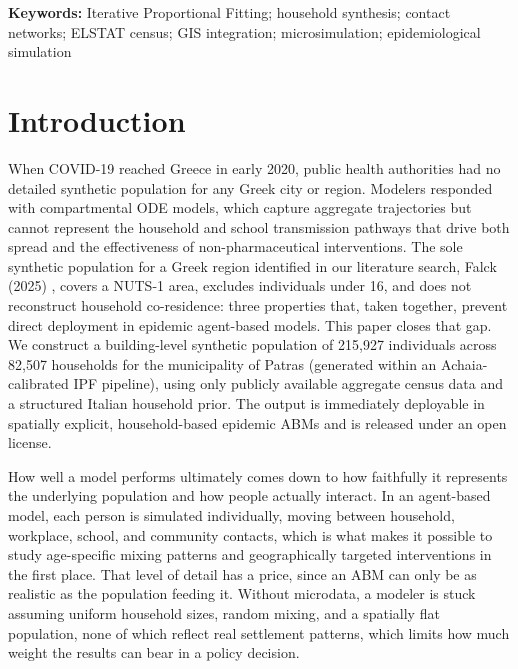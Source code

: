 \documentclass{article}
\begin{document}
\textbf{Keywords:} Iterative Proportional Fitting; household synthesis; contact networks; ELSTAT census; GIS integration; microsimulation; epidemiological simulation

\section{Introduction}\label{introduction}

When COVID-19 reached Greece in early 2020, public health authorities had no detailed synthetic population for any Greek city or region. Modelers responded with compartmental ODE models, which capture aggregate trajectories but cannot represent the household and school transmission pathways that drive both spread and the effectiveness of non-pharmaceutical interventions. The sole synthetic population for a Greek region identified in our literature search, Falck (2025) \cite{falck2025generatingspatialsyntheticpopulations}, covers a NUTS-1 area, excludes individuals under 16, and does not reconstruct household co-residence: three properties that, taken together, prevent direct deployment in epidemic agent-based models. This paper closes that gap. We construct a building-level synthetic population of 215,927 individuals across 82,507 households for the municipality of Patras (generated within an Achaia-calibrated IPF pipeline), using only publicly available aggregate census data and a structured Italian household prior. The output is immediately deployable in spatially explicit, household-based epidemic ABMs and is released under an open license.


How well a model performs ultimately comes down to how faithfully it represents the underlying population and how people actually interact. In an agent-based model, each person is simulated individually, moving between household, workplace, school, and community contacts, which is what makes it possible to study age-specific mixing patterns and geographically targeted interventions in the first place. That level of detail has a price, since an ABM can only be as realistic as the population feeding it. Without microdata, a modeler is stuck assuming uniform household sizes, random mixing, and a spatially flat population, none of which reflect real settlement patterns, which limits how much weight the results can bear in a policy decision.
\end{document}
